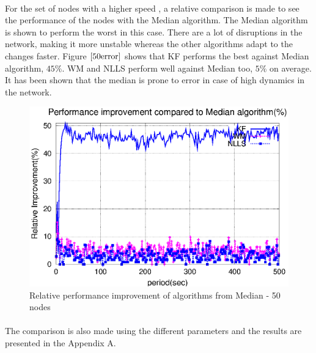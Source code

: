 \documentclass[a4paper,10pt]{report}
\begin{document}
\paragraph*{}
For the set of nodes with a higher speed , a relative comparison is made to see the performance of the nodes with the Median algorithm.
The Median algorithm is shown to perform the worst in this case. There are a lot of disruptions in the network, making it more unstable whereas the other algorithms adapt to the changes faster. Figure $\ref{50error}$ shows that KF performs the best against Median algorithm, $45\%$. WM and NLLS perform well against Median too, $5\%$ on average. It has been shown that the median is prone to error in case of high dynamics in the network.
\begin{figure}[!h]
\centering
\includegraphics[width=0.7  \textwidth]{50output-error}
\caption{Relative performance improvement of algorithms from Median - 50 nodes} \label{50error}
\end{figure}
\paragraph*{}
The comparison is also made using the different parameters and the results are presented in the Appendix A.
\end{document}
